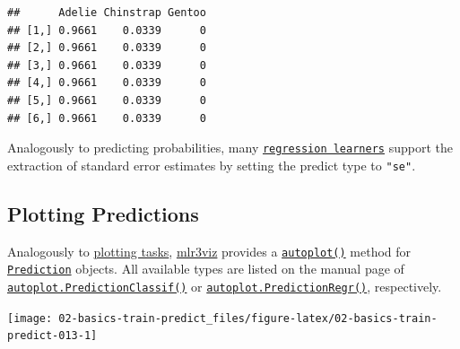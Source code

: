 \documentclass[
]{scrbook}
\newenvironment{Shaded}{\begin{snugshade}}{\end{snugshade}}
\newcommand{\AttributeTok}[1]{\textcolor[rgb]{0.77,0.63,0.00}{#1}}
\newcommand{\FunctionTok}[1]{\textcolor[rgb]{0.00,0.00,0.00}{#1}}
\newcommand{\NormalTok}[1]{#1}
\newcommand{\OtherTok}[1]{\textcolor[rgb]{0.56,0.35,0.01}{#1}}
\newcommand{\SpecialCharTok}[1]{\textcolor[rgb]{0.00,0.00,0.00}{#1}}
\newcommand{\StringTok}[1]{\textcolor[rgb]{0.31,0.60,0.02}{#1}}
\renewenvironment{Shaded} {\begin{snugshade}\small} {\end{snugshade}}
\begin{document}
\begin{verbatim}
##      Adelie Chinstrap Gentoo
## [1,] 0.9661    0.0339      0
## [2,] 0.9661    0.0339      0
## [3,] 0.9661    0.0339      0
## [4,] 0.9661    0.0339      0
## [5,] 0.9661    0.0339      0
## [6,] 0.9661    0.0339      0
\end{verbatim}

Analogously to predicting probabilities, many \href{https://mlr3.mlr-org.com/reference/LearnerRegr.html}{\texttt{regression\ learners}} support the extraction of standard error estimates by setting the predict type to \texttt{"se"}.

\hypertarget{autoplot-prediction}{%
\subsection{Plotting Predictions}\label{autoplot-prediction}}

Analogously to \protect\hyperlink{autoplot-task}{plotting tasks}, \href{https://mlr3viz.mlr-org.com}{mlr3viz} provides a \href{https://www.rdocumentation.org/packages/ggplot2/topics/autoplot}{\texttt{autoplot()}} method for \href{https://mlr3.mlr-org.com/reference/Prediction.html}{\texttt{Prediction}} objects.
All available types are listed on the manual page of \href{https://mlr3viz.mlr-org.com/reference/autoplot.PredictionClassif.html}{\texttt{autoplot.PredictionClassif()}} or \href{https://mlr3viz.mlr-org.com/reference/autoplot.PredictionRegr.html}{\texttt{autoplot.PredictionRegr()}}, respectively.

\begin{Shaded}
\end{Shaded}

\begin{center}\texttt{[image: 02-basics-train-predict\_files/figure-latex/02-basics-train-predict-013-1]} \end{center}
\end{document}
